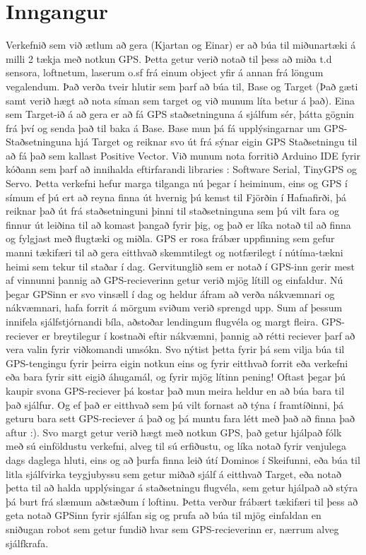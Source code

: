 \section{Inngangur}
Verkefnið sem við ætlum að gera (Kjartan og Einar) er að búa til miðunartæki á milli 2 tækja með notkun GPS. Þetta getur verið notað til þess að miða t.d sensora, loftnetum, laserum o.sf frá einum object yfir á annan frá löngum vegalendum. Það verða tveir hlutir sem þarf að búa til, Base og Target (Það gæti samt verið hægt að nota síman sem target og við munum líta betur á það). Eina sem Target-ið á að gera er að fá GPS staðsetninguna á sjálfum sér, þátta gögnin frá því og senda það til baka á Base. Base mun þá fá upplýsingarnar um GPS-Staðsetninguna hjá Target og reiknar svo út frá sýnar eigin GPS Staðsetningu til að fá það sem kallast Positive Vector. Við munum nota forritið Arduino IDE fyrir kóðann sem þarf að innihalda eftirfarandi libraries : Software Serial, TinyGPS og Servo. Þetta verkefni hefur marga tilganga nú þegar í heiminum, eins og GPS í símum ef þú ert að reyna finna út hvernig þú kemst til Fjörðin í Hafnafirði, þá reiknar það út frá staðsetninguni þinni til staðsetninguna sem þú vilt fara og finnur út leiðina til að komast þangað fyrir þig, og það er líka notað til að finna og fylgjast með flugtæki og miðla. GPS er rosa frábær uppfinning sem gefur manni tækifæri til að gera eitthvað skemmtilegt og notfærilegt í nútíma-tækni heimi sem tekur til staðar í dag. Gervitunglið sem er notað í GPS-inn gerir mest af vinnunni þannig að GPS-recieverinn getur verið mjög lítill og einfaldur. Nú þegar GPSinn er svo vinsæll í dag og heldur áfram að verða nákvæmnari og nákvæmnari, hafa forrit á mörgum sviðum verið sprengd upp. Sum af þessum innifela sjálfstjórnandi bíla, aðstoðar lendingum flugvéla og margt fleira. GPS-reciever er breytilegur í kostnaði eftir nákvæmni, þannig að rétti reciever þarf að vera valin fyrir viðkomandi umsókn. Svo nýtist þetta fyrir þá sem vilja búa til GPS-tengingu fyrir þeirra eigin notkun eins og fyrir eitthvað forrit eða verkefni eða bara fyrir sitt eigið áhugamál, og fyrir mjög lítinn pening! Oftast þegar þú kaupir svona GPS-reciever þá kostar það mun meira heldur en að búa bara til það sjálfur. Og ef það er eitthvað sem þú vilt fornast að týna í framtíðinni, þá geturu bara sett GPS-reciever á það og þá muntu fara létt með það að finna það aftur :). Svo margt getur verið hægt með notkun GPS, það getur hjálpað fólk með sú einföldustu verkefni, alveg til sú erfiðustu, og líka notað fyrir venjulega dags daglega hluti, eins og að þurfa finna leið útí Dominos í Skeifunni, eða búa til litla sjálfvirka teygjubyssu sem getur miðað sjálf á eitthvað Target, eða notað þetta til að halda upplýsingar á staðsetningu flugvéla, sem getur hjálpað að stýra þá burt frá slæmum aðstæðum í loftinu. Þetta verður frábært tækifæri til þess að geta notað GPSinn fyrir sjálfan sig og prufa að búa til mjög einfaldan en sniðugan robot sem getur fundið hvar sem GPS-recieverinn er, nærrum alveg sjálfkrafa.

